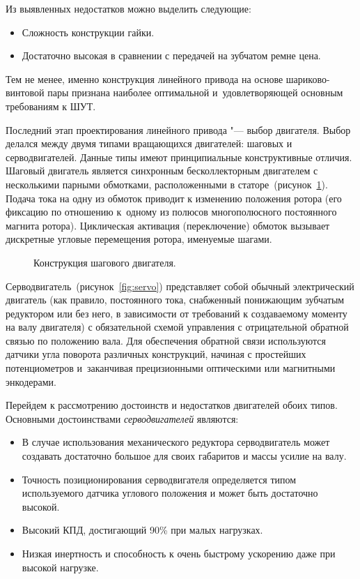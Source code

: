 Из выявленных недостатков можно выделить следующие:

\begin{itemize}
	\item Сложность конструкции гайки.
	
	\item Достаточно высокая в сравнении с передачей на зубчатом ремне цена.
\end{itemize}

Тем не менее, именно конструкция линейного привода на основе шариково-винтовой пары признана наиболее оптимальной и~удовлетворяющей основным требованиям к ШУТ. 

Последний этап проектирования линейного привода "--- выбор двигателя. Выбор делался между двумя типами вращающихся двигателей: шаговых и серводвигателей. Данные типы имеют принципиальные конструктивные отличия. Шаговый двигатель является синхронным бесколлекторным двигателем с несколькими парными обмотками, расположенными в статоре~(рисунок~\cref{fig:stepper}). Подача тока на одну из обмоток приводит к изменению положения ротора (его фиксацию по отношению к~одному из полюсов многополюсного постоянного магнита ротора). Циклическая активация (переключение) обмоток вызывает дискретные угловые перемещения ротора, именуемые шагами.

\begin{figure}[ht]
	\caption{Конструкция шагового двигателя.}\label{fig:stepper}
\end{figure}

Серводвигатель~(рисунок~\cref{fig:servo}) представляет собой обычный электрический двигатель (как правило, постоянного тока, снабженный понижающим зубчатым редуктором или без него, в зависимости от требований к создаваемому моменту на валу двигателя) с обязательной схемой управления с отрицательной обратной связью по положению вала. Для обеспечения обратной связи используются датчики угла поворота различных конструкций, начиная с простейших потенциометров и~заканчивая прецизионными оптическими или магнитными энкодерами.

Перейдем к рассмотрению достоинств и недостатков двигателей обоих типов. Основными достоинствами \textit{серводвигателей} являются:

\begin{itemize}
	\item В случае использования механического редуктора серводвигатель может создавать достаточно большое для своих габаритов и массы усилие на валу.
	
	\item Точность позиционирования серводвигателя определяется типом используемого датчика углового положения и может быть достаточно высокой.
	
	\item Высокий КПД, достигающий 90\% при малых нагрузках.
	
	\item Низкая инертность и способность к очень быстрому ускорению даже при высокой нагрузке.	
\end{itemize}

